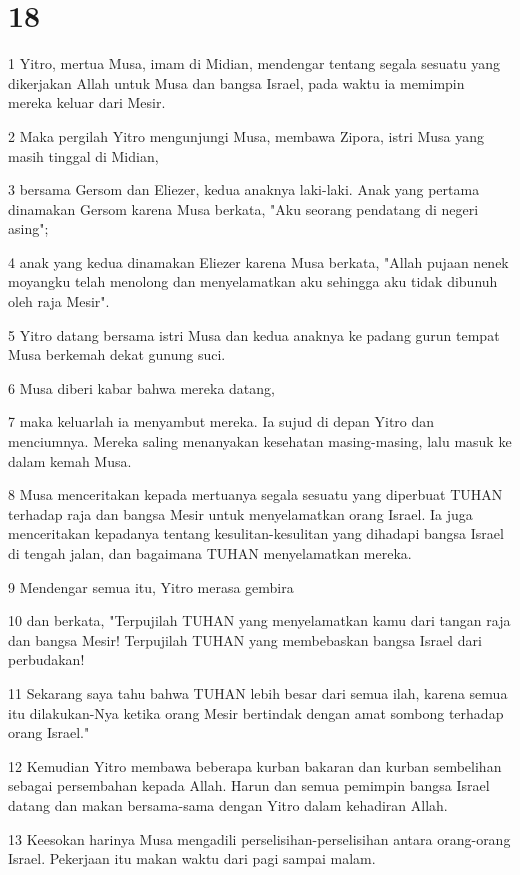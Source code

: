 \chapter{18}

\par 1 Yitro, mertua Musa, imam di Midian, mendengar tentang segala sesuatu yang dikerjakan Allah untuk Musa dan bangsa Israel, pada waktu ia memimpin mereka keluar dari Mesir.
\par 2 Maka pergilah Yitro mengunjungi Musa, membawa Zipora, istri Musa yang masih tinggal di Midian,
\par 3 bersama Gersom dan Eliezer, kedua anaknya laki-laki. Anak yang pertama dinamakan Gersom karena Musa berkata, "Aku seorang pendatang di negeri asing";
\par 4 anak yang kedua dinamakan Eliezer karena Musa berkata, "Allah pujaan nenek moyangku telah menolong dan menyelamatkan aku sehingga aku tidak dibunuh oleh raja Mesir".
\par 5 Yitro datang bersama istri Musa dan kedua anaknya ke padang gurun tempat Musa berkemah dekat gunung suci.
\par 6 Musa diberi kabar bahwa mereka datang,
\par 7 maka keluarlah ia menyambut mereka. Ia sujud di depan Yitro dan menciumnya. Mereka saling menanyakan kesehatan masing-masing, lalu masuk ke dalam kemah Musa.
\par 8 Musa menceritakan kepada mertuanya segala sesuatu yang diperbuat TUHAN terhadap raja dan bangsa Mesir untuk menyelamatkan orang Israel. Ia juga menceritakan kepadanya tentang kesulitan-kesulitan yang dihadapi bangsa Israel di tengah jalan, dan bagaimana TUHAN menyelamatkan mereka.
\par 9 Mendengar semua itu, Yitro merasa gembira
\par 10 dan berkata, "Terpujilah TUHAN yang menyelamatkan kamu dari tangan raja dan bangsa Mesir! Terpujilah TUHAN yang membebaskan bangsa Israel dari perbudakan!
\par 11 Sekarang saya tahu bahwa TUHAN lebih besar dari semua ilah, karena semua itu dilakukan-Nya ketika orang Mesir bertindak dengan amat sombong terhadap orang Israel."
\par 12 Kemudian Yitro membawa beberapa kurban bakaran dan kurban sembelihan sebagai persembahan kepada Allah. Harun dan semua pemimpin bangsa Israel datang dan makan bersama-sama dengan Yitro dalam kehadiran Allah.
\par 13 Keesokan harinya Musa mengadili perselisihan-perselisihan antara orang-orang Israel. Pekerjaan itu makan waktu dari pagi sampai malam.
